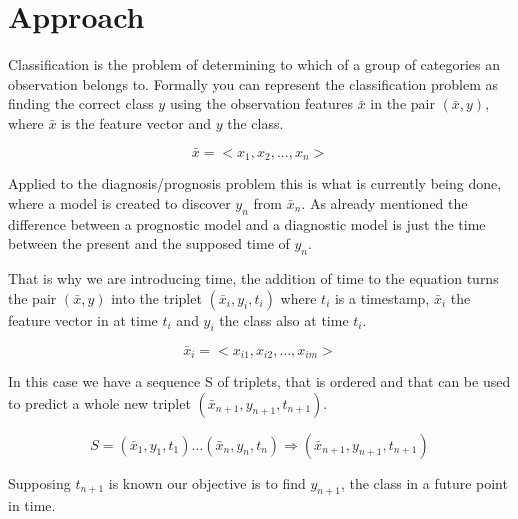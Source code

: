 \chapter{Approach}
\label{chapter:approach}

Classification is the problem of determining to which of a group of categories an observation belongs to. 
Formally you can represent the classification problem as finding the correct class $y$  using the observation
 features $\bar{x}$ in the pair $(\bar{x},y)$, where $\bar{x}$ is the feature vector and $y$ the class.

\begin{equation}
	\bar{x} = < x_1,x_2,...,x_n >
\label{eq:featurevector}
\end{equation}
 
 Applied to the diagnosis/prognosis problem this is what is currently being done, where a model is created to discover
 $y_n$  from $\bar{x}_n$. As already mentioned the difference between a prognostic model and a diagnostic model is just the
 time between the present and the supposed time of $y_n$. 

That is why we are introducing time, the addition of time to the equation turns the pair $(\bar{x},y)$ into the triplet
 $(\bar{x}_i,y_i,t_i )$ where $t_i$ is a timestamp, $\bar{x}_i$ the feature vector in at time $t_i$ and $y_i$ the class also at time $t_i$.

 \begin{equation}
	\bar{x}_i = < x_{i1},x_{i2},...,x_{im} >
\label{eq:temporalvector}
\end{equation}
 
 In this case we have a sequence S of triplets, that is ordered and that can be used to predict a whole new 
 triplet $(\bar{x}_{n+1},y_{n+1},t_{n+1})$.
 
  \begin{equation}
	S= (\bar{x}_1,y_1,t_1 )… (\bar{x}_n,y_n,t_n ) \Rightarrow (\bar{x}_{n+1},y_{n+1},t_{n+1} )
\label{eq:sequence}
\end{equation}

Supposing $t_{n+1}$ is known our objective is to find $y_{n+1}$, the class in a future point in time.

